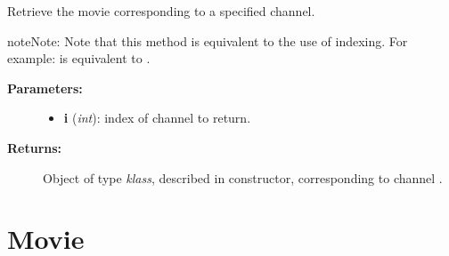 \documentclass[letterpaper,10pt,english]{sphinxmanual}
\begin{document}
\begin{fulllineitems}
\begin{fulllineitems}
\begin{description}
\begin{itemize}
\end{itemize}

\end{description}

\end{fulllineitems}


\begin{fulllineitems}
\label{data_structures:tiff.wanglab.MultiChannelTiff.get_channel}
Retrieve the movie corresponding to a specified channel.

\begin{notice}{note}{Note:}
Note that this method is equivalent to the use of indexing. For example:  is equivalent to .
\end{notice}
\begin{description}
\item[{\textbf{Parameters:}}] \leavevmode\begin{itemize}
\item {} 
\textbf{i} (\emph{int}): index of channel to return.

\end{itemize}

\item[{\textbf{Returns:}}] \leavevmode
Object of type \emph{klass}, described in constructor, corresponding to channel .

\end{description}

\end{fulllineitems}


\end{fulllineitems}



\section{Movie}
\label{data_structures:movie}
\end{document}
